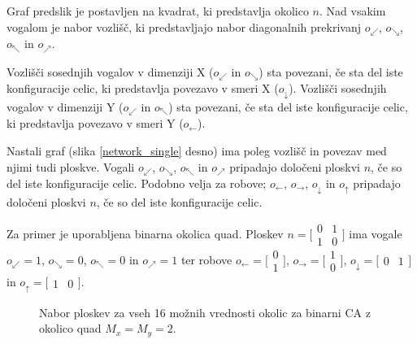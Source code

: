 \documentclass[12pt,a4paper,openany,twoside]{book}
\begin{document}
Graf predslik je postavljen na kvadrat, ki predstavlja okolico \(n\).
Nad vsakim vogalom je nabor vozlišč, ki predstavljajo nabor diagonalnih prekrivanj
\(o_{\swarrow}\), \(o_{\searrow}\), \(o_{\nwarrow}\) in \(o_{\nearrow}\).

Vozlišči sosednjih vogalov v dimenziji X (\(o_{\swarrow}\) in \(o_{\searrow}\)) sta povezani,
če sta del iste konfiguracije celic, ki predstavlja povezavo v smeri X (\(o_{\downarrow}\)).
Vozlišči sosednjih vogalov v dimenziji Y (\(o_{\swarrow}\) in \(o_{\nwarrow}\)) sta povezani,
če sta del iste konfiguracije celic, ki predstavlja povezavo v smeri Y (\(o_{\leftarrow}\)).

Nastali graf (slika \ref{network_single} desno) ima poleg vozlišč in povezav med njimi tudi ploskve.
Vogali \(o_{\swarrow}\), \(o_{\searrow}\), \(o_{\nwarrow}\) in \(o_{\nearrow}\)
pripadajo določeni ploskvi \(n\), če so del iste konfiguracije celic.
Podobno velja za robove; \(o_{\leftarrow}\), \(o_{\rightarrow}\), \(o_{\downarrow}\) in \(o_{\uparrow}\)
pripadajo določeni ploskvi \(n\), če so del iste konfiguracije celic.

Za primer je uporabljena binarna okolica quad.
Ploskev \(n=\bigl[\begin{smallmatrix} 0&1 \\ 1&0 \end{smallmatrix}\bigr]\)
ima vogale \(o_{\swarrow}=1\), \(o_{\searrow}=0\), \(o_{\nwarrow}=0\) in \(o_{\nearrow}=1\) ter robove
\(o_{\leftarrow}=\bigl[\begin{smallmatrix} 0 \\ 1 \end{smallmatrix}\bigr]\),
\(o_{\rightarrow}=\bigl[\begin{smallmatrix} 1 \\ 0 \end{smallmatrix}\bigr]\),
\(o_{\downarrow}=\bigl[\begin{smallmatrix} 0 & 1 \end{smallmatrix}\bigr]\) in
\(o_{\uparrow}=\bigl[\begin{smallmatrix} 1 & 0 \end{smallmatrix}\bigr]\).

\begin{figure}[htb]
\centerline{}
\caption[Nabor ploskev.]{Nabor ploskev za vseh 16 možnih vrednosti okolic za binarni CA z okolico quad \(M_x=M_y=2\).}
\label{neighborhood_surfaces}
\end{figure}
\end{document}
